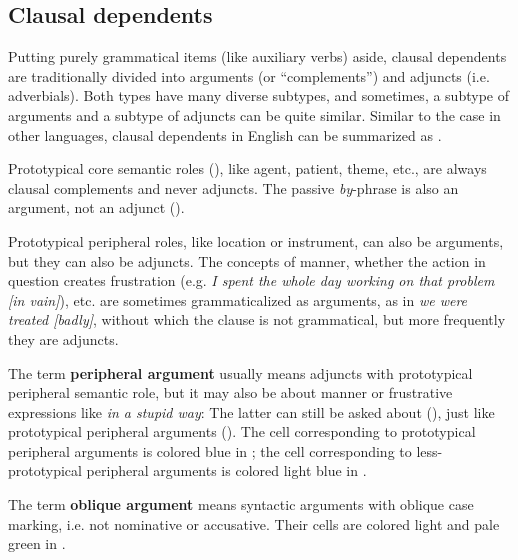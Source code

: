 \documentclass[UTF8, a4paper, oneside, scheme=plain]{ctexrep}
\newcommand*{\concept}[1]{\textbf{#1}}
\newcommand{\corpus}[1]{\emph{#1}}
\begin{document}
\subsection{Clausal dependents}\label{sec:simple-clause.dependents}

Putting purely grammatical items (like auxiliary verbs) aside,
clausal dependents are traditionally divided into arguments (or ``complements'') and adjuncts (i.e. adverbials).
Both types have many diverse subtypes,
and sometimes, 
a subtype of arguments and a subtype of adjuncts can be quite similar.
Similar to the case in other languages, 
clausal dependents in English can be summarized as .

Prototypical core semantic roles (), 
like agent, patient, theme, etc.,
are always clausal complements and never adjuncts.
The passive \corpus{by}-phrase is also an argument, not an adjunct 
().

Prototypical peripheral roles, like location or instrument, can also be arguments,
but they can also be adjuncts.
The concepts of manner, whether the action in question creates frustration 
(e.g. \corpus{I spent the whole day working on that problem [in vain]}), etc.
are sometimes grammaticalized as arguments,
as in \corpus{we were treated [badly]},
without which the clause is not grammatical,
but more frequently they are adjuncts.

The term \concept{peripheral argument}
usually means adjuncts with prototypical peripheral semantic role,
but it may also be about manner or frustrative expressions like \corpus{in a stupid way}:
The latter can still be asked about (), 
just like prototypical peripheral arguments (). 
The cell corresponding to prototypical peripheral arguments
is colored blue in ;
the cell corresponding to less-prototypical peripheral arguments
is colored light blue in .

The term \concept{oblique argument} 
means syntactic arguments with oblique case marking, i.e. not nominative or accusative.
Their cells are colored light and pale green in .
\end{document}
